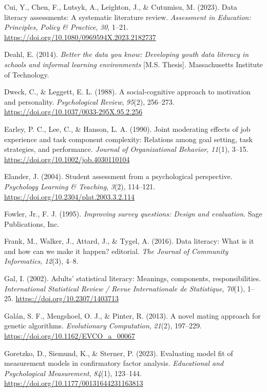 \documentclass[
  12pt,
  a4paper,
  twoside]{article}
\newlength{\cslhangindent}
\newenvironment{CSLReferences}[2] %
 {\begin{list}{}{%
  \setlength{\itemindent}{0pt}
  \setlength{\leftmargin}{0pt}
  \setlength{\parsep}{0pt}
  \ifodd #1
   \setlength{\leftmargin}{\cslhangindent}
   \setlength{\itemindent}{-1\cslhangindent}
  \fi
  \setlength{\itemsep}{#2\baselineskip}}}
 {\end{list}}
\begin{document}
\begin{CSLReferences}{1}{0}
Cui, Y., Chen, F., Lutsyk, A., Leighton, J., \& Cutumisu, M. (2023). Data literacy assessments: A systematic literature review. \emph{Assessment in Education: Principles, Policy \& Practice}, \emph{30}, 1--21. \url{https://doi.org/10.1080/0969594X.2023.2182737}

Deahl, E. (2014). \emph{Better the data you know: Developing youth data literacy in schools and informal learning environments} {[}M.S. Thesis{]}. Massachusetts Institute of Technology.

Dweck, C., \& Leggett, E. L. (1988). A social-cognitive approach to motivation and personality. \emph{Psychological Review}, \emph{95}(2), 256--273. \url{https://doi.org/10.1037/0033-295X.95.2.256}

Earley, P. C., Lee, C., \& Hanson, L. A. (1990). Joint moderating effects of job experience and task component complexity: Relations among goal setting, task strategies, and performance. \emph{Journal of Organizational Behavior}, \emph{11}(1), 3--15. \url{https://doi.org/10.1002/job.4030110104}

Elander, J. (2004). Student assessment from a psychological perspective. \emph{Psychology Learning \& Teaching}, \emph{3}(2), 114--121. \url{https://doi.org/10.2304/plat.2003.3.2.114}

Fowler, Jr., F. J. (1995). \emph{Improving survey questions: Design and evaluation}. Sage Publications, Inc.

Frank, M., Walker, J., Attard, J., \& Tygel, A. (2016). Data literacy: What is it and how can we make it happen? editorial. \emph{The Journal of Community Informatics}, \emph{12}(3), 4--8.

Gal, I. (2002). Adults' statistical literacy: Meanings, components, responsibilities. \emph{International Statistical Review / Revue Internationale de Statistique}, \emph{70}(1), 1--25. \url{https://doi.org/10.2307/1403713}

Galán, S. F., Mengshoel, O. J., \& Pinter, R. (2013). A novel mating approach for genetic algorithms. \emph{Evolutionary Computation}, \emph{21}(2), 197--229. \url{https://doi.org/10.1162/EVCO_a_00067}

Goretzko, D., Siemund, K., \& Sterner, P. (2023). Evaluating model fit of measurement models in confirmatory factor analysis. \emph{Educational and Psychological Measurement}, \emph{84}(1), 123--144. \url{https://doi.org/10.1177/00131644231163813}


\end{CSLReferences}
\end{document}
